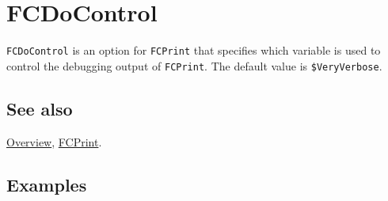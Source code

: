 \documentclass[../FeynCalcManual.tex]{subfiles}
\begin{document}
\hypertarget{fcdocontrol}{%
\section{FCDoControl}\label{fcdocontrol}}

\texttt{FCDoControl} is an option for \texttt{FCPrint} that specifies
which variable is used to control the debugging output of
\texttt{FCPrint}. The default value is \texttt{\$VeryVerbose}.

\subsection{See also}

\hyperlink{toc}{Overview}, \hyperlink{fcprint}{FCPrint}.

\subsection{Examples}
\end{document}
